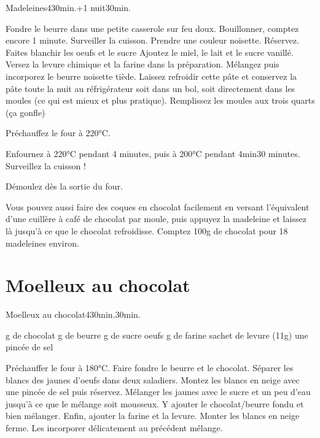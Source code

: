 {\begin{recette}{Madeleines}{4}{30min.+1 nuit}{30min.}
\begin{preparation}
\etape Fondre le beurre dans une petite casserole sur feu doux. Bouillonner, comptez encore 1 minute. Surveiller la cuisson. Prendre une couleur noisette. Réservez.
\etape Faites blanchir les oeufs et le sucre
\etape Ajoutez le miel, le lait et le sucre vanillé. Versez la levure chimique et la farine dans la préparation.
\etape Mélangez puis incorporez le beurre noisette tiède. Laissez refroidir cette pâte et conservez la pâte toute la nuit au réfrigérateur soit dans un bol, soit directement dans les moules (ce qui est mieux et plus pratique). Remplissez les moules aux trois quarts (ça gonfle)
\end{preparation}

\begin{cuisson}
Préchauffez le four à 220°C. 

Enfournez à 220°C pendant 4 minutes, puis à 200°C pendant 4min30 minutes. Surveillez la cuisson !

Démoulez dès la sortie du four.

\begin{remarque}
Vous pouvez aussi faire des coques en chocolat facilement en versant l'équivalent d'une cuillère à café de chocolat par moule, puis appuyez la madeleine et laissez là jusqu'à ce que le chocolat refroidisse. Comptez 100g de chocolat pour 18 madeleines environ.
\end{remarque}

\end{cuisson}
\end{recette}

\section{Moelleux au chocolat}
\begin{recette}{Moelleux au chocolat}{4}{30min.}{30min.}
\begin{ingredients}
 g de chocolat
 g de beurre
 g de sucre
 oeufs
 g de farine
 sachet de levure (11g)
\ingredient une pincée de sel
\end{ingredients}

\begin{preparation}
\etape Préchauffer le four à 180°C.
\etape Faire fondre le beurre et le chocolat.
\etape Séparer les blancs des jaunes d'oeufs dans deux saladiers.
\etape Montez les blancs en neige avec une pincée de sel puis réservez. 
\etape Mélanger les jaunes avec le sucre et un peu d’eau jusqu’à ce que le mélange soit mousseux. 
\etape Y ajouter le chocolat/beurre fondu et bien mélanger. Enfin, ajouter la farine et la levure.
\etape Monter les blancs en neige ferme. Les incorporer délicatement au précédent mélange. 
\end{preparation}


\end{recette}}
